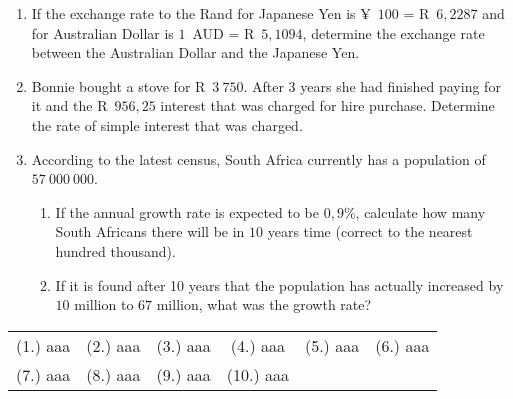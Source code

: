 \begin{eocexercises}{}
\begin{enumerate}[label=\textbf{\arabic*}.]
	\item If the exchange rate to the Rand for Japanese Yen is
          ¥~$100$ = R~$6,2287$ and for Australian Dollar is $1$~AUD =
          R~$5,1094$, determine the exchange rate between the
          Australian Dollar and the Japanese Yen.

	\item Bonnie bought a stove for R~$3~750$. After $3$ years she had finished paying for it and the R~$956,25$ interest that was charged for hire purchase. Determine the rate of simple interest that was charged.

	\item According to the latest census, South Africa currently has a population of $57~000~000$.
	\begin{enumerate}[noitemsep, label=\textbf{(\alph*)} ]
	    \item If the annual growth rate is expected to be $0,9\%$, calculate how many South Africans there will be in $10$ years time (correct to the nearest hundred thousand).

	    \item If it is found after 10 years that the population has actually increased by $10$ million to $67$ million, what was the growth rate?
	\end{enumerate}

    \end{enumerate}
\practiceinfo

    \begin{tabular}[h]{cccccc}
	(1.) aaa & (2.) aaa & (3.) aaa & (4.) aaa & (5.) aaa & (6.) aaa \\
	(7.) aaa & (8.) aaa & (9.) aaa & (10.) aaa\\
    \end{tabular}
\end{eocexercises}
